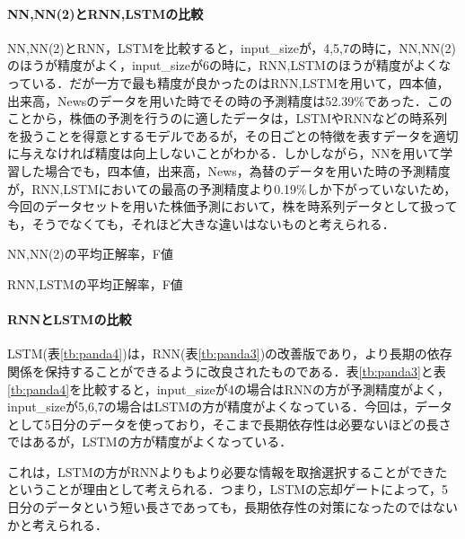 \documentclass[a4paper,11pt]{ltjsarticle}
\begin{document}
\paragraph{NN,NN(2)とRNN,LSTMの比較}
NN,NN(2)とRNN，LSTMを比較すると，input\_sizeが，4,5,7の時に，NN,NN(2)のほうが精度がよく，input\_sizeが6の時に，RNN,LSTMのほうが精度がよくなっている．だが一方で最も精度が良かったのはRNN,LSTMを用いて，四本値，出来高，Newsのデータを用いた時でその時の予測精度は52.39\%であった．このことから，株価の予測を行うのに適したデータは，LSTMやRNNなどの時系列を扱うことを得意とするモデルであるが，その日ごとの特徴を表すデータを適切に与えなければ精度は向上しないことがわかる．しかしながら，NNを用いて学習した場合でも，四本値，出来高，News，為替のデータを用いた時の予測精度が，RNN,LSTMにおいての最高の予測精度より0.19\%しか下がっていないため，今回のデータセットを用いた株価予測において，株を時系列データとして扱っても，そうでなくても，それほど大きな違いはないものと考えられる．
\begin{table}[htbp]
  \begin{minipage}[c]{0.45\textwidth}
    \centering
    
    \caption{NN,NN(2)の平均正解率，F値}
    \label{tb:NN}
  \end{minipage}
  \begin{minipage}[c]{0.45\textwidth}
    \centering
    
    \caption{RNN,LSTMの平均正解率，F値}
    \label{tb:RNN}
  \end{minipage}
\end{table}
\paragraph{RNNとLSTMの比較}
LSTM(表\ref{tb:panda4})は，RNN(表\ref{tb:panda3})の改善版であり，より長期の依存関係を保持することができるように改良されたものである．表\ref{tb:panda3}と表\ref{tb:panda4}を比較すると，input\_sizeが4の場合はRNNの方が予測精度がよく，input\_sizeが5,6,7の場合はLSTMの方が精度がよくなっている．今回は，データとして5日分のデータを使っており，そこまで長期依存性は必要ないほどの長さではあるが，LSTMの方が精度がよくなっている．

これは，LSTMの方がRNNよりもより必要な情報を取捨選択することができたということが理由として考えられる．つまり，LSTMの忘却ゲートによって，5日分のデータという短い長さであっても，長期依存性の対策になったのではないかと考えられる．
\end{document}
